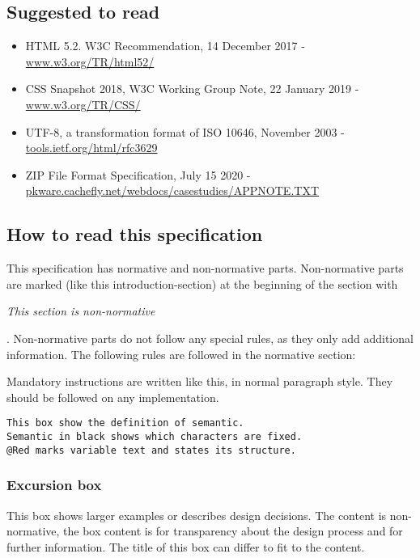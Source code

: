 \documentclass[12pt,a4paper]{article}
\begin{document}
\subsection{Suggested to read}

\begin{itemize}
\item HTML 5.2. W3C Recommendation, 14 December 2017 - \url{www.w3.org/TR/html52/}
\item CSS Snapshot 2018, W3C Working Group Note, 22 January 2019 - \url{www.w3.org/TR/CSS/}
\item UTF-8, a transformation format of ISO 10646, November 2003 - \url{tools.ietf.org/html/rfc3629}
\item ZIP File Format Specification, July 15 2020 - \url{pkware.cachefly.net/webdocs/casestudies/APPNOTE.TXT}
\end{itemize}

\subsection{How to read this specification}

This specification has normative and non-normative parts. Non-normative parts are marked (like this introduction-section) at the beginning of the section with \begin{small}\textit{This section is non-normative}\end{small}. Non-normative parts do not follow any special rules, as they only add additional information. The following rules are followed in the normative section:

Mandatory instructions are written like this, in normal paragraph style. They should be followed on any implementation.

\begin{lstlisting}[frame=single,style=base]
This box show the definition of semantic.
Semantic in black shows which characters are fixed.
@Red marks variable text and states its structure.
\end{lstlisting}

\begin{tcolorbox}
\subsubsection*{Excursion box}
This box shows larger examples or describes design decisions. The content is non-normative, the box content is for transparency about the design process and for further information. The title of this box can differ to fit to the content.
\end{tcolorbox}
\end{document}
